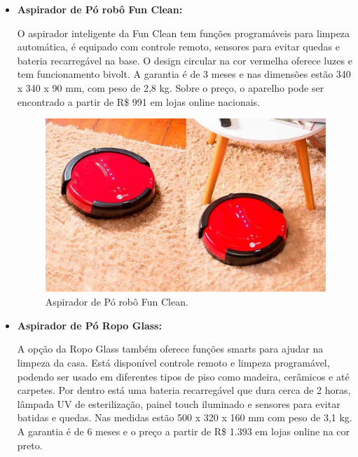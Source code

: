 \begin{itemize}
		\item \textbf{Aspirador de Pó robô Fun Clean:}

			 O aspirador inteligente da Fun Clean tem funções programáveis para limpeza automática, é equipado com controle remoto, sensores para evitar quedas e bateria recarregável na base. O design circular na cor vermelha oferece luzes e tem funcionamento bivolt. A garantia é de 3 meses e nas dimensões estão 340 x 340 x 90 mm, com peso de 2,8 kg. Sobre o preço, o aparelho pode ser encontrado a partir de R\$ 991 em lojas online nacionais.

			\begin{figure}[H]
				\centering
				\includegraphics[scale=0.55]{figuras/pm_fun_clean.png}
				\caption{Aspirador de Pó robô Fun Clean.}
				\label{img:pm_fun_clean}
			\end{figure}

		\item \textbf{Aspirador de Pó Ropo Glass:}

			A opção da Ropo Glass também oferece funções smarts para ajudar na limpeza da casa. Está disponível controle remoto e limpeza programável, podendo ser usado em diferentes tipos de piso como madeira, cerâmicos e até carpetes. Por dentro está uma bateria recarregável que dura cerca de 2 horas, lâmpada UV de esterilização, painel touch iluminado e sensores para evitar batidas e quedas. Nas medidas estão 500 x 320 x 160 mm com peso de 3,1 kg. A garantia é de 6 meses e o preço a partir de R\$ 1.393 em lojas online na cor preto.


\end{itemize}

